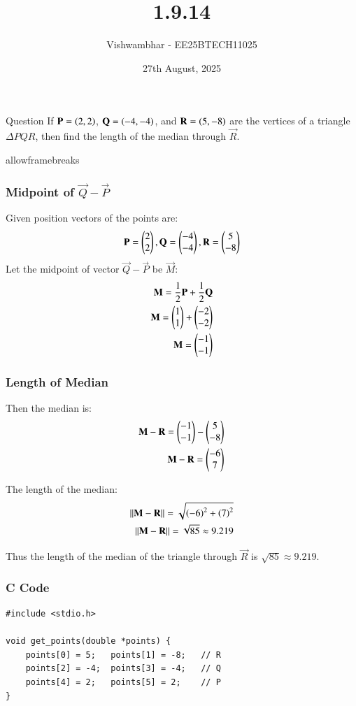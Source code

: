 \documentclass{beamer}
\title{1.9.14}
\date{27th August, 2025}
\author{Vishwambhar - EE25BTECH11025}
\begin{document}
\frame{\titlepage}
\begin{frame}{Question}
If $\mathbf{P}=\left(2,2\right)$, $\mathbf{Q}=\left(-4,-4\right)$, and $\mathbf{R}=\left(5,-8\right)$ are the vertices of a triangle $\Delta PQR$, then find the length of the median through $\vec{R}$.\\
\end{frame}

\begin{frame}{allowframebreaks}
\frametitle{Midpoint of $\vec{Q}-\vec{P}$}
Given position vectors of the points are:
\begin{align}
    \mathbf{P}=\begin{pmatrix}2\\2\end{pmatrix},
    \mathbf{Q}=\begin{pmatrix}-4\\-4\end{pmatrix},
    \mathbf{R}=\begin{pmatrix}5\\-8\end{pmatrix}
\end{align}
Let the midpoint of vector $\vec{Q}-\vec{P}$ be $\vec{M}$:
\begin{align}
    \mathbf{M}=\frac{1}{2}\mathbf{P}+\frac{1}{2}\mathbf{Q}\\
    \mathbf{M}=\begin{pmatrix}1\\1\end{pmatrix}+\begin{pmatrix}-2\\-2\end{pmatrix}\\
    \mathbf{M}=\begin{pmatrix}-1\\-1\end{pmatrix}
\end{align}
\end{frame}

\begin{frame}[fragile]
\frametitle{Length of Median}
Then the median is:
\begin{align}
    \mathbf{M}-\mathbf{R}=\begin{pmatrix}-1\\-1\end{pmatrix}-\begin{pmatrix}5\\-8\end{pmatrix}\\
    \mathbf{M}-\mathbf{R}=\begin{pmatrix}-6\\7\end{pmatrix}
\end{align}

The length of the median:
\begin{align}
    ||\mathbf{M}-\mathbf{R}||=\sqrt{\left(-6\right)^2+\left(7\right)^2}\\
    ||\mathbf{M}-\mathbf{R}||=\sqrt{85}\approx9.219
\end{align}

Thus the length of the median of the triangle through $\vec{R}$ is $\sqrt{85}\approx9.219$.
\end{frame}

\begin{frame}[fragile]
    \frametitle{C Code}
    \begin{lstlisting}
#include <stdio.h>

void get_points(double *points) {
    points[0] = 5;   points[1] = -8;   // R
    points[2] = -4;  points[3] = -4;   // Q
    points[4] = 2;   points[5] = 2;    // P
}
    \end{lstlisting}
\end{frame}
\end{document}
